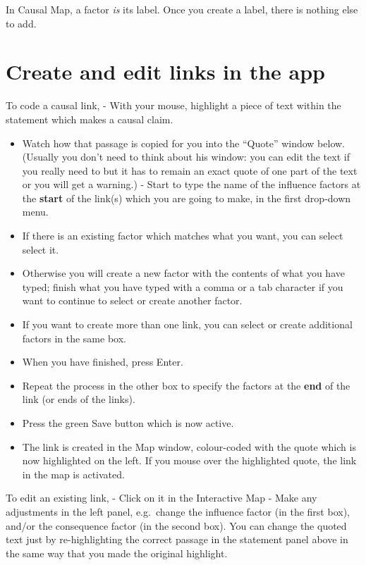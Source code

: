 \documentclass[
]{book}
\begin{document}
In Causal Map, a factor \emph{is} its label. Once you create a label, there is nothing else to add.

\hypertarget{create-and-edit-links-in-the-app}{%
\section{Create and edit links in the app}\label{create-and-edit-links-in-the-app}}

To code a causal link, - With your mouse, highlight a piece of text within the statement which makes a causal claim.

\begin{itemize}
\item
  Watch how that passage is copied for you into the ``Quote'' window below. (Usually you don't need to think about his window: you can edit the text if you really need to but it has to remain an exact quote of one part of the text or you will get a warning.) - Start to type the name of the influence factors at the \textbf{start} of the link(s) which you are going to make, in the first drop-down menu.
\item
  If there is an existing factor which matches what you want, you can select select it.
\item
  Otherwise you will create a new factor with the contents of what you have typed; finish what you have typed with a comma or a tab character if you want to continue to select or create another factor.
\item
  If you want to create more than one link, you can select or create additional factors in the same box.
\item
  When you have finished, press Enter.
\item
  Repeat the process in the other box to specify the factors at the \textbf{end} of the link (or ends of the links).
\item
  Press the green Save button which is now active.
\item
  The link is created in the Map window, colour-coded with the quote which is now highlighted on the left. If you mouse over the highlighted quote, the link in the map is activated.
\end{itemize}

To edit an existing link, - Click on it in the Interactive Map - Make any adjustments in the left panel, e.g.~change the influence factor (in the first box), and/or the consequence factor (in the second box). You can change the quoted text just by re-highlighting the correct passage in the statement panel above in the same way that you made the original highlight.
\end{document}
